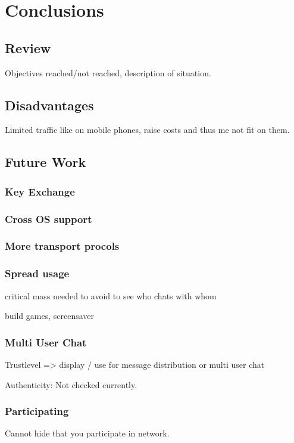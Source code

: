 \chapter{Conclusions}
\section{Review}
Objectives reached/not reached, description of situation.
\section{Disadvantages}
Limited traffic like on mobile phones, raise costs and thus me not
fit on them.
\section{Future Work}
\subsection{Key Exchange}
\subsection{Cross OS support}
\subsection{More transport procols}
\subsection{Spread usage}
critical mass needed to avoid to see who chats with whom

build games, screensaver
\subsection{Multi User Chat}

Trustlevel => display / use for message distribution or multi user chat

Authenticity: Not checked currently.

\subsection{Participating}
Cannot hide that you participate in network.
